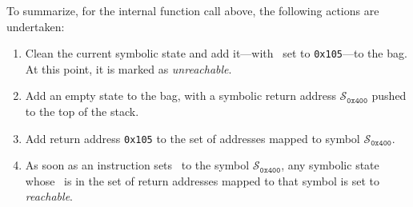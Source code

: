 To summarize, for the internal function call above, the following actions are undertaken:
\begin{enumerate}
  \item Clean the current symbolic state and add it---with \rip\ set to \texttt{0x105}---to the bag.
  At this point, it is marked as \emph{unreachable}.
  \item Add an empty state to the bag, with a symbolic return address $\mathcal{S}_\mathtt{0x400}$ pushed to the top of the stack.
  \item Add return address \texttt{0x105} to the set of addresses mapped to symbol $\mathcal{S}_\mathtt{0x400}$.
  \item As soon as an instruction sets \rip\ to the symbol $\mathcal{S}_\mathtt{0x400}$, any symbolic state whose \rip\ is in the set of return addresses mapped to that symbol is set to \emph{reachable}.
\end{enumerate}
